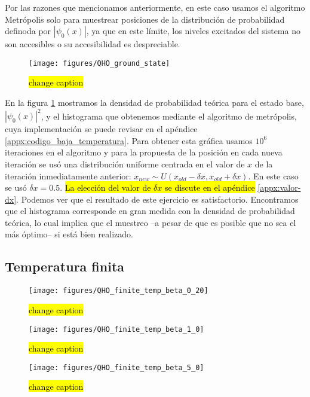 \documentclass[%
 reprint,
 amsmath,amssymb,
 aps,
 pra,
]{revtex4-2}
\begin{document}
Por las razones que mencionamos anteriormente, en este caso usamos el algoritmo Metrópolis solo para muestrear posiciones de la distribución de probabilidad definoda por $|\psi_0(x)|$, ya que en este límite, los niveles excitados del sistema no son accesibles o su accesibilidad es despreciable. 

\begin{figure}[!h]
	\centering
	\texttt{[image: figures/QHO\_ground\_state]}
	\caption{\hl{change caption}}
	\label{fig:ground_state}
\end{figure}

En la figura \ref{fig:ground_state} mostramos la densidad de probabilidad teórica para el estado base, $|\psi_0(x)|^2$, y el histograma que obtenemos mediante el algoritmo de metrópolis, cuya implementación se puede revisar en el apéndice \ref{appx:codigo_baja_temperatura}. Para obtener esta gráfica usamos $10^6$ iteraciones en el algoritmo y para la propuesta de la posición en cada nueva iteración se usó una distribución uniforme centrada en el valor de $x$ de la iteración inmediatamente anterior: $x_{new} \sim U(x_{old} - \delta x, x_{old} + \delta x)$. En este caso se usó $\delta x = 0.5$. \hl{La elección del valor de $\delta x$ se discute en el apéndice} \ref{appx:valor-dx}. Podemos ver que el resultado de este ejercicio es satisfactorio. Encontramos que el histograma corresponde en gran medida con la densidad de probabilidad teórica, lo cual implica que el muestreo –a pesar de que es posible que no sea el más óptimo– si está bien realizado.

\subsection{Temperatura finita}

\begin{figure}[!t]
	\centering
	\texttt{[image: figures/QHO\_finite\_temp\_beta\_0\_20]}
	\caption{\hl{change caption}}
	\label{fig:beta_0.2}
\end{figure}

\begin{figure}[!t]
	\centering
	\texttt{[image: figures/QHO\_finite\_temp\_beta\_1\_0]}
	\caption{\hl{change caption}}
	\label{fig:beta_1.0}
\end{figure}

\begin{figure}[!t]
	\centering
	\texttt{[image: figures/QHO\_finite\_temp\_beta\_5\_0]}
	\caption{\hl{change caption}}
	\label{fig:beta_5.0}
\end{figure}
\end{document}
